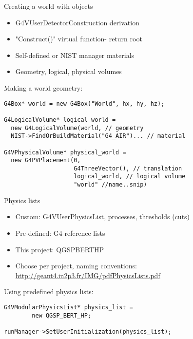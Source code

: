 \documentclass[aspectratio=169]{beamer}
\begin{document}
\begin{frame}[fragile]{Creating a world with objects}
  \begin{itemize}
  \item G4VUserDetectorConstruction derivation
  \item "Construct()" virtual function- return root
  \item Self-defined or NIST manager materials
  \item Geometry, logical, physical volumes
  \end{itemize}
  
  \begin{block}{Making a world geometry:}
    \begin{Verbatim}[fontsize=\small]
G4Box* world = new G4Box("World", hx, hy, hz);
      
G4LogicalVolume* logical_world =
  new G4LogicalVolume(world, // geometry
  NIST->FindOrBuildMaterial("G4_AIR")... // material
  
G4VPhysicalVolume* physical_world =
  new G4PVPlacement(0,
                    G4ThreeVector(), // translation
                    logical_world, // logical volume
                    "world" //name..snip)
    \end{Verbatim}
  \end{block}
\end{frame}

\begin{frame}[fragile]{Physics lists}
  \begin{itemize}
  \item Custom: G4VUserPhysicsList, processes, thresholds (cuts)
  \item Pre-defined: G4 reference lists
  \item This project: QGSP\textunderscore BERT\textunderscore HP
  \item Choose per project, naming conventions: \href{http://geant4.in2p3.fr/IMG/pdf_PhysicsLists.pdf}{http://geant4.in2p3.fr/IMG/pdf\textunderscore PhysicsLists.pdf}
    
  \end{itemize}

  \begin{block}{Using predefined physics lists:}
    \begin{Verbatim}[fontsize=\small]
G4VModularPhysicsList* physics_list =
		new QGSP_BERT_HP;

runManager->SetUserInitialization(physics_list);

    \end{Verbatim}
  \end{block}
\end{frame}
\end{document}
